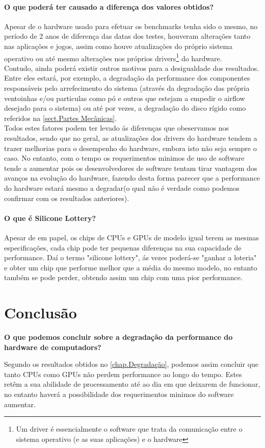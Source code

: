\documentclass{report}
\begin{document}
\subsubsection{O que poderá ter causado a diferença dos valores obtidos?}
\label{subsubsect.causas}
	Apesar de o hardware usado para efetuar os benchmarks tenha sido o mesmo, no período de 2 anos de diferença das datas dos testes, houveram alterações tanto nas aplicações e jogos, assim como houve atualizações do próprio sistema operativo ou até mesmo alterações nos próprios drivers\footnote{Um driver é essencialmente o software que trata da comunicação entre o sistema operativo (e as suas aplicações) e o hardware} do hardware.\\
	Contudo, ainda poderá existir outros motivos para a desigualdade dos resultados. Entre eles estará, por exemplo, a degradação da performance dos componentes responsáveis pelo arrefecimento do sistema (através da degradação das própria ventoinhas e/ou particulas como pó e outros que estejam a empedir o airflow desejado para o sistema) ou até por vezes, a degradação do disco rígido como referidos na \autoref{sect.Partes Mecânicas}.\\
	Todos estes fatores podem ter levado ás diferenças que obeservamos nos resultados, sendo que no geral, as atualizações dos drivers do hardware tendem a trazer melhorias para o desempenho do hardware, embora isto não seja sempre o caso. No entanto, com o tempo os requerimentos minimos de uso de software tende a aumentar pois os desenvolvedores de software tentam tirar vantagem dos avanços na evolução do hardware, fazendo desta forma parecer que a performance do hardware estará mesmo a degradar(o qual não é verdade como podemos confirmar com os resultados anteriores).
	
\subsubsection{O que é Silicone Lottery?\cite{siliclot}}
\label{subsubsect.lottery}
	Apesar de em papel, os chips de \ac{CPU}s e \ac{GPU}s de modelo igual terem as mesmas especificações, cada chip pode ter pequenas diferenças na sua capacidade de performance. Daí o termo "silicone lottery", ás vezes poderá-se "ganhar a loteria" e obter um chip que performe melhor que a média do mesmo modelo, no entanto também se pode perder, obtendo assim um chip com uma pior performance.
	
\chapter{Conclusão}
\label{chap.Conclusão}
	\begin{Large}
	\textbf{O que podemos concluir sobre a degradação da performance do hardware de computadors?}\\
	\end{Large}
	Segundo os resultados obtidos no \autoref{chap.Degradação}, podemos assim concluir que tanto \ac{CPU}s como \ac{GPU}s não perdem performance ao longo do tempo. Estes retêm a sua abilidade de processamento até ao dia em que deixarem de funcionar, no entanto haverá a possibilidade dos requerimentos minimos do software aumentar. \\
	
\end{document}
